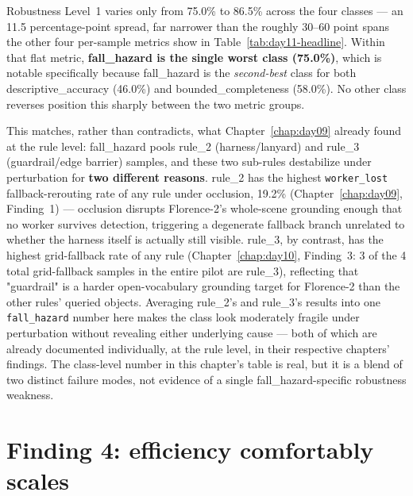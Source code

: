 Robustness Level~1 varies only from 75.0\% to 86.5\% across the four classes --- an 11.5
percentage-point spread, far narrower than the roughly 30--60 point spans the other four
per-sample metrics show in Table~\ref{tab:day11-headline}. Within that flat metric,
\textbf{fall\_hazard is the single worst class (75.0\%)}, which is notable specifically because
fall\_hazard is the \emph{second-best} class for both descriptive\_accuracy (46.0\%) and
bounded\_completeness (58.0\%). No other class reverses position this sharply between the two
metric groups.

This matches, rather than contradicts, what Chapter~\ref{chap:day09} already found at the rule
level: fall\_hazard pools rule\_2 (harness/lanyard) and rule\_3 (guardrail/edge barrier)
samples, and these two sub-rules destabilize under perturbation for \textbf{two different
reasons}. rule\_2 has the highest \texttt{worker\_lost} fallback-rerouting rate of any rule
under occlusion, 19.2\% (Chapter~\ref{chap:day09}, Finding~1) --- occlusion disrupts Florence-2's
whole-scene grounding enough that no worker survives detection, triggering a degenerate
fallback branch unrelated to whether the harness itself is actually still visible. rule\_3, by
contrast, has the highest grid-fallback rate of any rule (Chapter~\ref{chap:day10}, Finding~3:
3 of the 4 total grid-fallback samples in the entire pilot are rule\_3), reflecting that
"guardrail" is a harder open-vocabulary grounding target for Florence-2 than the other rules'
queried objects. Averaging rule\_2's and rule\_3's results into one \texttt{fall\_hazard} number
here makes the class look moderately fragile under perturbation without revealing either
underlying cause --- both of which are already documented individually, at the rule level, in
their respective chapters' findings. The class-level number in this chapter's table is real, but
it is a blend of two distinct failure modes, not evidence of a single fall\_hazard-specific
robustness weakness.

\section{Finding 4: efficiency comfortably scales}

